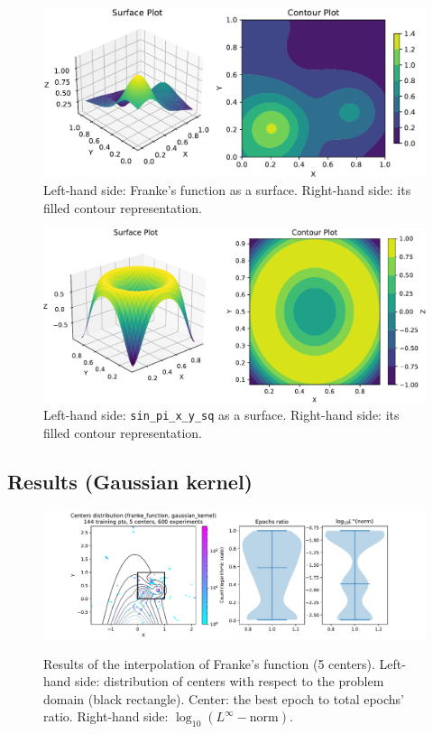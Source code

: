 \documentclass[12pt]{report} %
\begin{document}
\begin{figure}[ht]
  \includegraphics[width=\textwidth]{imagenes/experiments/2d/franke_interpolation/Franke_Function_Surface_Contour.pdf}
  \caption{Left-hand side: Franke's function as a surface. Right-hand side:
    its filled contour representation.}
  \label{fig:franke-function-surface-contour}
\end{figure}

\begin{figure}[ht]
  \includegraphics[width=\textwidth]{imagenes/experiments/2d/sin_pi_x_y_sq_interpolation/Sin_pi_x_y_sq_Contour.pdf}
  \caption{Left-hand side: \texttt{sin\_pi\_x\_y\_sq} as a surface. Right-hand side:
    its filled contour representation.}
  \label{fig:sin-pi-x-y-sq-function-surface-contour}
\end{figure}


\subsection*{Results (Gaussian kernel)}

\begin{figure}[H]
  {\includegraphics[width=\textwidth, trim={2cm 0 2.8cm 0}, clip=true]{imagenes/experiments/2d/franke_interpolation/tr12_c5_franke_function_gaussian_kernel.pdf}}
  \caption{Results of the interpolation of Franke's function (5 centers).
    Left-hand side: distribution of centers with respect to the problem domain (black rectangle). Center: the best epoch to total epochs' ratio.
    Right-hand side: $\log_{10}(L^\infty-\text{norm})$.}
  \label{fig:franke-tr12-c5}
\end{figure}
\end{document}
